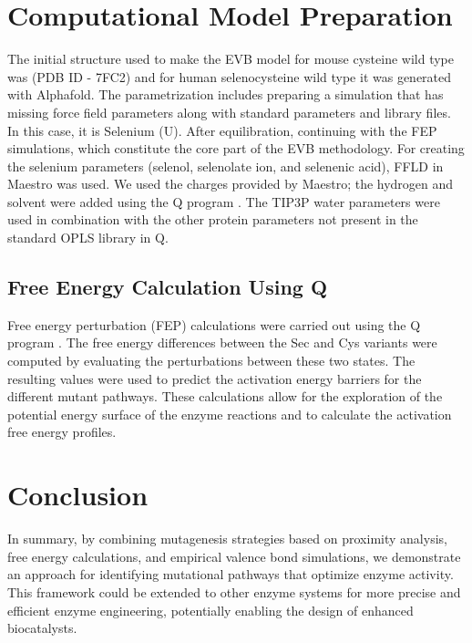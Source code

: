 \documentclass[journal=jacsat,manuscript=article]{achemso}
\begin{document}
\section{Computational Model Preparation}

The initial structure used to make the EVB model for mouse cysteine wild type was (PDB ID - 7FC2) and for human selenocysteine wild type it was generated with Alphafold. The parametrization includes preparing a simulation that has missing force field parameters along with standard parameters and library files. In this case, it is Selenium (U). After equilibration, continuing with the FEP simulations, which constitute the core part of the EVB methodology. For creating the selenium parameters (selenol, selenolate ion, and selenenic acid), FFLD in Maestro was used. We used the charges provided by Maestro; the hydrogen and solvent were added using the Q program \cite{Marelius1999}. The TIP3P water parameters were used in combination with the other protein parameters not present in the standard OPLS library in Q.

\subsection{Free Energy Calculation Using Q}

Free energy perturbation (FEP) calculations were carried out using the Q program \cite{Marelius1999}. The free energy differences between the Sec and Cys variants were computed by evaluating the perturbations between these two states. The resulting values were used to predict the activation energy barriers for the different mutant pathways. These calculations allow for the exploration of the potential energy surface of the enzyme reactions and to calculate the activation free energy profiles.

\section{Conclusion}

In summary, by combining mutagenesis strategies based on proximity analysis, free energy calculations, and empirical valence bond simulations, we demonstrate an approach for identifying mutational pathways that optimize enzyme activity. This framework could be extended to other enzyme systems for more precise and efficient enzyme engineering, potentially enabling the design of enhanced biocatalysts.
\end{document}
